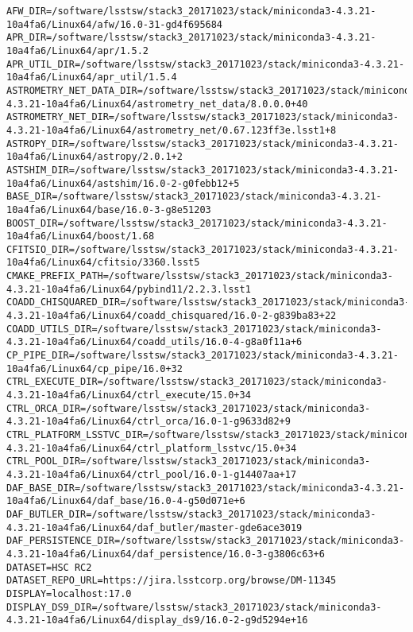 \begin{verbatim}
AFW_DIR=/software/lsstsw/stack3_20171023/stack/miniconda3-4.3.21-10a4fa6/Linux64/afw/16.0-31-gd4f695684
APR_DIR=/software/lsstsw/stack3_20171023/stack/miniconda3-4.3.21-10a4fa6/Linux64/apr/1.5.2
APR_UTIL_DIR=/software/lsstsw/stack3_20171023/stack/miniconda3-4.3.21-10a4fa6/Linux64/apr_util/1.5.4
ASTROMETRY_NET_DATA_DIR=/software/lsstsw/stack3_20171023/stack/miniconda3-4.3.21-10a4fa6/Linux64/astrometry_net_data/8.0.0.0+40
ASTROMETRY_NET_DIR=/software/lsstsw/stack3_20171023/stack/miniconda3-4.3.21-10a4fa6/Linux64/astrometry_net/0.67.123ff3e.lsst1+8
ASTROPY_DIR=/software/lsstsw/stack3_20171023/stack/miniconda3-4.3.21-10a4fa6/Linux64/astropy/2.0.1+2
ASTSHIM_DIR=/software/lsstsw/stack3_20171023/stack/miniconda3-4.3.21-10a4fa6/Linux64/astshim/16.0-2-g0febb12+5
BASE_DIR=/software/lsstsw/stack3_20171023/stack/miniconda3-4.3.21-10a4fa6/Linux64/base/16.0-3-g8e51203
BOOST_DIR=/software/lsstsw/stack3_20171023/stack/miniconda3-4.3.21-10a4fa6/Linux64/boost/1.68
CFITSIO_DIR=/software/lsstsw/stack3_20171023/stack/miniconda3-4.3.21-10a4fa6/Linux64/cfitsio/3360.lsst5
CMAKE_PREFIX_PATH=/software/lsstsw/stack3_20171023/stack/miniconda3-4.3.21-10a4fa6/Linux64/pybind11/2.2.3.lsst1
COADD_CHISQUARED_DIR=/software/lsstsw/stack3_20171023/stack/miniconda3-4.3.21-10a4fa6/Linux64/coadd_chisquared/16.0-2-g839ba83+22
COADD_UTILS_DIR=/software/lsstsw/stack3_20171023/stack/miniconda3-4.3.21-10a4fa6/Linux64/coadd_utils/16.0-4-g8a0f11a+6
CP_PIPE_DIR=/software/lsstsw/stack3_20171023/stack/miniconda3-4.3.21-10a4fa6/Linux64/cp_pipe/16.0+32
CTRL_EXECUTE_DIR=/software/lsstsw/stack3_20171023/stack/miniconda3-4.3.21-10a4fa6/Linux64/ctrl_execute/15.0+34
CTRL_ORCA_DIR=/software/lsstsw/stack3_20171023/stack/miniconda3-4.3.21-10a4fa6/Linux64/ctrl_orca/16.0-1-g9633d82+9
CTRL_PLATFORM_LSSTVC_DIR=/software/lsstsw/stack3_20171023/stack/miniconda3-4.3.21-10a4fa6/Linux64/ctrl_platform_lsstvc/15.0+34
CTRL_POOL_DIR=/software/lsstsw/stack3_20171023/stack/miniconda3-4.3.21-10a4fa6/Linux64/ctrl_pool/16.0-1-g14407aa+17
DAF_BASE_DIR=/software/lsstsw/stack3_20171023/stack/miniconda3-4.3.21-10a4fa6/Linux64/daf_base/16.0-4-g50d071e+6
DAF_BUTLER_DIR=/software/lsstsw/stack3_20171023/stack/miniconda3-4.3.21-10a4fa6/Linux64/daf_butler/master-gde6ace3019
DAF_PERSISTENCE_DIR=/software/lsstsw/stack3_20171023/stack/miniconda3-4.3.21-10a4fa6/Linux64/daf_persistence/16.0-3-g3806c63+6
DATASET=HSC RC2
DATASET_REPO_URL=https://jira.lsstcorp.org/browse/DM-11345
DISPLAY=localhost:17.0
DISPLAY_DS9_DIR=/software/lsstsw/stack3_20171023/stack/miniconda3-4.3.21-10a4fa6/Linux64/display_ds9/16.0-2-g9d5294e+16

\end{verbatim}
